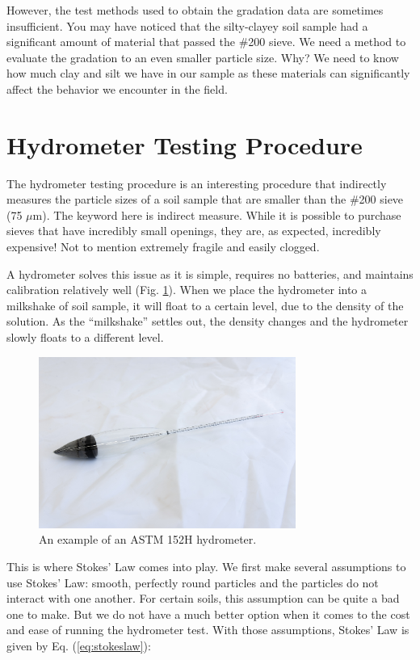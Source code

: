 \documentclass[12pt]{article}
\begin{document}
However, the test methods used to obtain the gradation data are sometimes insufficient. You may have noticed that the silty-clayey soil sample had a significant amount of material that passed the \#200 sieve. We need a method to evaluate the gradation to an even smaller particle size. Why? We need to know how much clay and silt we have in our sample as these materials can significantly affect the behavior we encounter in the field.

\pagebreak
\section{Hydrometer Testing Procedure}
The hydrometer testing procedure is an interesting procedure that indirectly measures the particle sizes of a soil sample that are smaller than the \#200 sieve (75 $\mu$m). The keyword here is indirect measure. While it is possible to purchase sieves that have incredibly small openings, they are, as expected, incredibly expensive! Not to mention extremely fragile and easily clogged.

A hydrometer solves this issue as it is simple, requires no batteries, and maintains calibration relatively well (Fig. \ref{fig:hydrometer}). When we place the hydrometer into a milkshake of soil sample, it will float to a certain level, due to the density of the solution. As the ``milkshake'' settles out, the density changes and the hydrometer slowly floats to a different level. 

\begin{figure}[H]
    \centering
    \includegraphics[width=0.75\textwidth]{GEO_5728.jpg}
    \caption{An example of an ASTM 152H hydrometer.}
    \label{fig:hydrometer}
\end{figure}

This is where Stokes' Law comes into play. We first make several assumptions to use Stokes' Law: smooth, perfectly round particles and the particles do not interact with one another. For certain soils, this assumption can be quite a bad one to make. But we do not have a much better option when it comes to the cost and ease of running the hydrometer test. With those assumptions, Stokes' Law is given by Eq. (\ref{eq:stokeslaw}):
\end{document}
